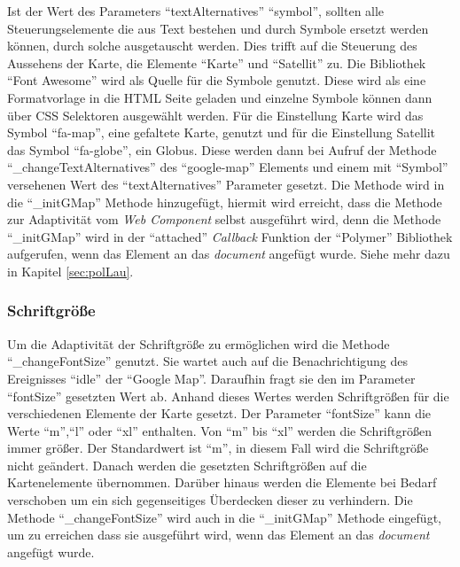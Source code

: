 \documentclass[12pt, paper=a4, bibtotoc, toc=listof, headsepline=true]{scrreprt}
\begin{document}
	\newline
	Ist der Wert des Parameters \enquote{textAlternatives} \enquote{symbol}, sollten alle Steuerungselemente die aus Text bestehen und durch Symbole ersetzt werden können, durch solche ausgetauscht werden. Dies trifft auf die Steuerung des Aussehens der Karte, die Elemente \enquote{Karte} und \enquote{Satellit} zu. Die Bibliothek \enquote{Font Awesome} wird als Quelle für die Symbole genutzt\cite{fonAwe}. Diese wird als eine Formatvorlage in die \ac{HTML} Seite geladen und einzelne Symbole können dann über \ac{CSS} Selektoren ausgewählt werden. Für die Einstellung Karte wird das Symbol \enquote{fa-map}, eine gefaltete Karte, genutzt und für die Einstellung Satellit das Symbol \enquote{fa-globe}, ein Globus. Diese werden dann bei Aufruf der Methode \enquote{\_changeTextAlternatives} des \enquote{google-map} Elements und einem mit \enquote{Symbol} versehenen Wert des \enquote{textAlternatives} Parameter gesetzt. Die Methode wird in die \enquote{\_initGMap} Methode hinzugefügt, hiermit wird erreicht, dass die Methode zur Adaptivität vom \emph{Web Component} selbst ausgeführt wird, denn die Methode \enquote{\_initGMap} wird in der \enquote{attached} \emph{Callback} Funktion der \enquote{Polymer} Bibliothek aufgerufen, wenn das Element an das \emph{document} angefügt wurde. Siehe mehr dazu in Kapitel \ref{sec:polLau}.
	\subsubsection{Schriftgröße}
	\label{sec:fontsize}
	Um die Adaptivität der Schriftgröße zu ermöglichen wird die Methode \enquote{\_changeFontSize} genutzt.  Sie wartet auch auf die Benachrichtigung des Ereignisses \enquote{idle} der \enquote{Google Map}. Daraufhin fragt sie den im Parameter \enquote{fontSize} gesetzten Wert ab. Anhand dieses Wertes werden Schriftgrößen für die verschiedenen Elemente der Karte gesetzt. Der Parameter \enquote{fontSize} kann die Werte \enquote{m},\enquote{l} oder \enquote{xl} enthalten. Von \enquote{m} bis \enquote{xl} werden die Schriftgrößen immer größer. Der Standardwert ist \enquote{m}, in diesem Fall wird die Schriftgröße nicht geändert. Danach werden die gesetzten Schriftgrößen auf die Kartenelemente übernommen. Darüber hinaus werden die Elemente bei Bedarf verschoben um ein sich gegenseitiges Überdecken dieser zu verhindern. Die Methode \enquote{\_changeFontSize} wird auch in die \enquote{\_initGMap} Methode eingefügt, um zu erreichen dass sie ausgeführt wird, wenn das Element an das \emph{document} angefügt wurde.
\end{document}
